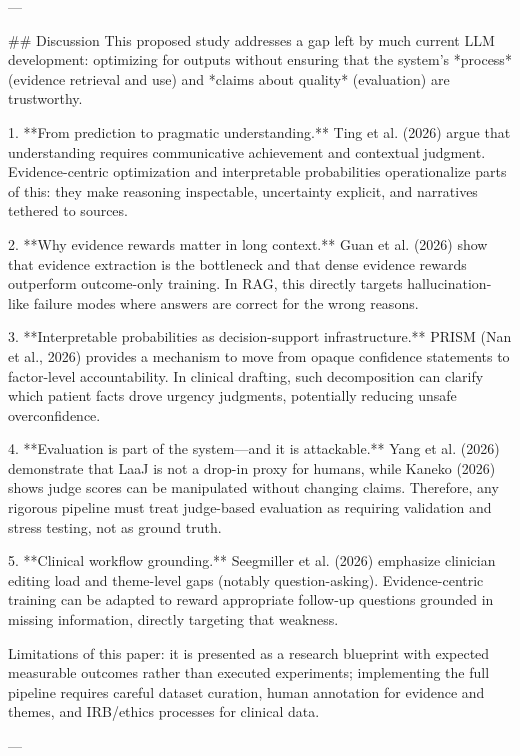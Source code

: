 ---

## Discussion  
This proposed study addresses a gap left by much current LLM development: optimizing for outputs without ensuring that the system’s *process* (evidence retrieval and use) and *claims about quality* (evaluation) are trustworthy.

1. **From prediction to pragmatic understanding.** Ting et al. (2026) argue that understanding requires communicative achievement and contextual judgment. Evidence-centric optimization and interpretable probabilities operationalize parts of this: they make reasoning inspectable, uncertainty explicit, and narratives tethered to sources.

2. **Why evidence rewards matter in long context.** Guan et al. (2026) show that evidence extraction is the bottleneck and that dense evidence rewards outperform outcome-only training. In RAG, this directly targets hallucination-like failure modes where answers are correct for the wrong reasons.

3. **Interpretable probabilities as decision-support infrastructure.** PRISM (Nan et al., 2026) provides a mechanism to move from opaque confidence statements to factor-level accountability. In clinical drafting, such decomposition can clarify which patient facts drove urgency judgments, potentially reducing unsafe overconfidence.

4. **Evaluation is part of the system—and it is attackable.** Yang et al. (2026) demonstrate that LaaJ is not a drop-in proxy for humans, while Kaneko (2026) shows judge scores can be manipulated without changing claims. Therefore, any rigorous pipeline must treat judge-based evaluation as requiring validation and stress testing, not as ground truth.

5. **Clinical workflow grounding.** Seegmiller et al. (2026) emphasize clinician editing load and theme-level gaps (notably question-asking). Evidence-centric training can be adapted to reward appropriate follow-up questions grounded in missing information, directly targeting that weakness.

Limitations of this paper: it is presented as a research blueprint with expected measurable outcomes rather than executed experiments; implementing the full pipeline requires careful dataset curation, human annotation for evidence and themes, and IRB/ethics processes for clinical data.

---

